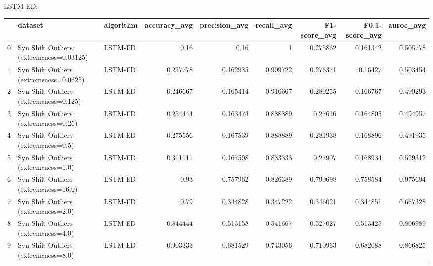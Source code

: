 LSTM-ED:

\begin{tabular}{rllrrrrrr}
\hline
    & dataset                                  & algorithm   &   accuracy\_avg &   precision\_avg &   recall\_avg &   F1-score\_avg &   F0.1-score\_avg &   auroc\_avg \\
\hline
  0 & Syn Shift Outliers (extremeness=0.03125) & LSTM-ED     &       0.16     &        0.16     &     1        &       0.275862 &         0.161342 &    0.505778 \\
  1 & Syn Shift Outliers (extremeness=0.0625)  & LSTM-ED     &       0.237778 &        0.162935 &     0.909722 &       0.276371 &         0.16427  &    0.503454 \\
  2 & Syn Shift Outliers (extremeness=0.125)   & LSTM-ED     &       0.246667 &        0.165414 &     0.916667 &       0.280255 &         0.166767 &    0.499293 \\
  3 & Syn Shift Outliers (extremeness=0.25)    & LSTM-ED     &       0.254444 &        0.163474 &     0.888889 &       0.27616  &         0.164805 &    0.494957 \\
  4 & Syn Shift Outliers (extremeness=0.5)     & LSTM-ED     &       0.275556 &        0.167539 &     0.888889 &       0.281938 &         0.168896 &    0.491935 \\
  5 & Syn Shift Outliers (extremeness=1.0)     & LSTM-ED     &       0.311111 &        0.167598 &     0.833333 &       0.27907  &         0.168934 &    0.529312 \\
  6 & Syn Shift Outliers (extremeness=16.0)    & LSTM-ED     &       0.93     &        0.757962 &     0.826389 &       0.790698 &         0.758584 &    0.975694 \\
  7 & Syn Shift Outliers (extremeness=2.0)     & LSTM-ED     &       0.79     &        0.344828 &     0.347222 &       0.346021 &         0.344851 &    0.667328 \\
  8 & Syn Shift Outliers (extremeness=4.0)     & LSTM-ED     &       0.844444 &        0.513158 &     0.541667 &       0.527027 &         0.513425 &    0.806989 \\
  9 & Syn Shift Outliers (extremeness=8.0)     & LSTM-ED     &       0.903333 &        0.681529 &     0.743056 &       0.710963 &         0.682088 &    0.866825 \\
\hline
\end{tabular}

